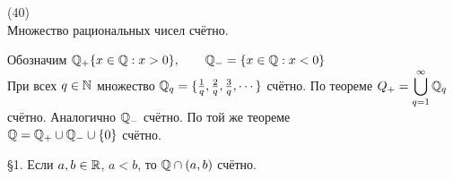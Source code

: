 (40)\\

\T Множество рациональных чисел счётно.

\D Обозначим $\mathbb{Q}_+ \{x\in \mathbb{Q}: x > 0\}, \qquad \mathbb{Q}_- = \{x \in \mathbb{Q}: x < 0\}$\\
При всех $q \in \mathbb{N}$ множество $\mathbb{Q}_q = \{\frac{1}{q}, \frac{2}{q}, \frac{3}{q}, \cdots\}$ счётно. По теореме $Q_+ = \displaystyle\bigcup^{\infty}_{q=1} \mathbb{Q}_q$ счётно. Аналогично $\mathbb{Q}_-$ счётно. По той же теореме\\
$\mathbb{Q} = \mathbb{Q}_+ \cup \mathbb{Q}_- \cup \{0\}$ счётно.

\S1. Если $a, b \in \mathbb{R}$, $a < b$, то $\mathbb{Q} \cap (a, b)$ счётно.